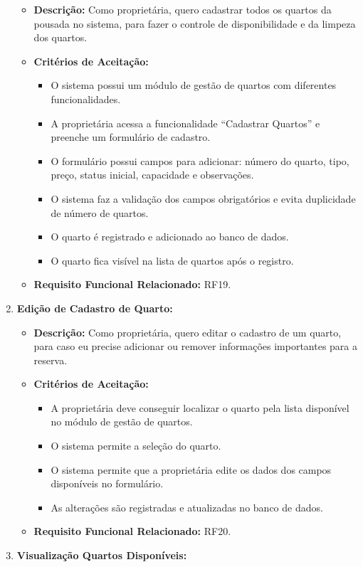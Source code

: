 \documentclass[
	12pt,				%
	openany,			%
	oneside,			%
	a4paper,			%
	english,			%
	french,				%
	spanish,			%
	brazil				%
	]{abntex2}
\begin{document}
\begin{enumerate}[label=\textbf{\arabic*.}]
\begin{itemize}
		\item \textbf{Descrição:} Como proprietária, quero cadastrar todos os quartos da pousada no sistema, para fazer o controle de disponibilidade e da limpeza dos quartos.
		\item \textbf{Critérios de Aceitação:}
		\begin{itemize}
			\item O sistema possui um módulo de gestão de quartos com diferentes funcionalidades.
			\item A proprietária acessa a funcionalidade “Cadastrar Quartos” e preenche um formulário de cadastro.
			\item O formulário possui campos para adicionar: número do quarto, tipo, preço, status inicial, capacidade e observações.
			\item O sistema faz a validação dos campos obrigatórios e evita duplicidade de número de quartos.
			\item O quarto é registrado e adicionado ao banco de dados.
			\item O quarto fica visível na lista de quartos após o registro.
		\end{itemize}
		\item \textbf{Requisito Funcional Relacionado:} RF19.
	\end{itemize} 
	\item \textbf{Edição de Cadastro de Quarto:}
	\begin{itemize}
		\item \textbf{Descrição:} Como proprietária, quero editar o cadastro de um quarto, para caso eu precise adicionar ou remover informações importantes para a reserva.
		\item \textbf{Critérios de Aceitação:}
		\begin{itemize}
			\item A proprietária deve conseguir localizar o quarto pela lista disponível no módulo de gestão de quartos.
			\item O sistema permite a seleção do quarto.
			\item O sistema permite que a proprietária edite os dados dos campos disponíveis no formulário.
			\item As alterações são registradas e atualizadas no banco de dados.
		\end{itemize}
		\item \textbf{Requisito Funcional Relacionado:} RF20.
	\end{itemize} 
	\item \textbf{Visualização Quartos Disponíveis:}

\end{enumerate}
\end{document}

